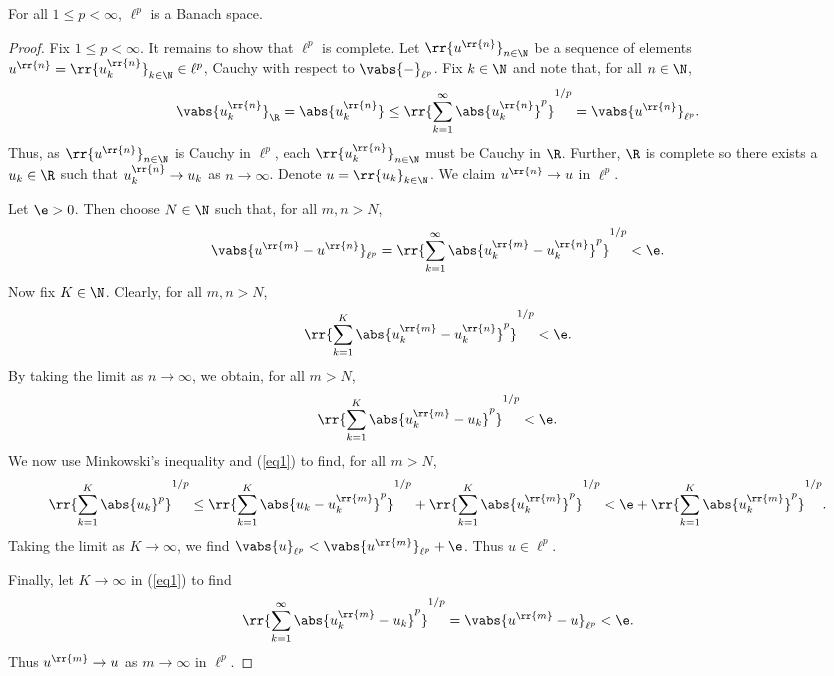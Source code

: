 \documentclass{article}
\begin{document}
\begin{claim*}[4]
	For all $1\leq p<\infty$, $\ell^p$ is a Banach space.
	\begin{proof}
		Fix $1\leq p<\infty$. It remains to show that $\ell^p$ is complete. Let $\rr{u^{\rr{n}}}_{n\in\N}$ be a sequence
		of elements $u^{\rr{n}}=\rr{u^{\rr{n}}_k}_{k\in\N}\in\ell^p$, Cauchy with respect to $\vabs{-}_{\ell^p}$.
		Fix $k\in\N$ and note that, for all $n\in\N$,
		\begin{align*}
			\vabs{u_k^{\rr{n}}}_{\R}=\abs{u_k^{\rr{n}}} \leq \rr{\sum_{k=1}^{\infty} \abs{u_k^{\rr{n}}}^p}^{1/p}=\vabs{u^{\rr{n}}}_{\ell^p}.
		\end{align*}
		Thus, as $\rr{u^{\rr{n}}}_{n\in\N}$ is Cauchy in $\ell^p$, each $\rr{u^{\rr{n}}_k}_{n\in\N}$ must be
		Cauchy in $\R$. Further, $\R$ is complete so there exists a $u_k\in\R$ such that $u^{\rr{n}}_k\to u_k$ as
		$n\to\infty$. Denote $u=\rr{u_k}_{k\in\N}$. We claim $u^{\rr{n}}\to u$ in $\ell^p$.

		Let $\e>0$. Then choose $N\in\N$ such that, for all $m,n>N$,
		\begin{align*}
			\vabs{u^{\rr{m}} - u^{\rr{n}}}_{\ell^p} = \rr{\sum_{k=1}^{\infty} \abs{u^{\rr{m}}_k-u^{\rr{n}}_k}^p}^{1/p} < \e.
		\end{align*}
		Now fix $K\in\N$. Clearly, for all $m,n>N$,
		\begin{align*}
			\rr{\sum_{k=1}^{K} \abs{u^{\rr{m}}_k-u^{\rr{n}}_k}^p}^{1/p} < \e.
		\end{align*}
		By taking  the limit as $n\to\infty$, we obtain, for all $m>N$,
		\begin{align}
			\label{eq1}
			\rr{\sum_{k=1}^{K} \abs{u^{\rr{m}}_k-u_k}^p}^{1/p} < \e.
		\end{align}
		We now use Minkowski's inequality and (\ref{eq1}) to find, for all $m>N$,
		\begin{align*}
			\rr{\sum_{k=1}^{K} \abs{u_k}^p}^{1/p} \leq \rr{\sum_{k=1}^{K} \abs{u_k-u^{\rr{m}}_k}^p}^{1/p} + \rr{\sum_{k=1}^{K} \abs{u^{\rr{m}}_k}^p}^{1/p}
			< \e + \rr{\sum_{k=1}^{K} \abs{u^{\rr{m}}_k}^p}^{1/p}.
		\end{align*}
		Taking the limit as $K\to\infty$, we find $\vabs{u}_{\ell^p} < \vabs{u^{\rr{m}}}_{\ell^p} + \e$. Thus $u\in\ell^p$.

		Finally, let $K\to\infty$ in (\ref{eq1}) to find
		\begin{align*}
			\rr{\sum_{k=1}^{\infty} \abs{u^{\rr{m}}_k-u_k}^p}^{1/p} = \vabs{u^{\rr{m}}-u}_{\ell^p}< \e.
		\end{align*}
		Thus $u^{\rr{m}}\to u$ as $m\to\infty$ in $\ell^p$.
	\end{proof}
\end{claim*}
\end{document}
